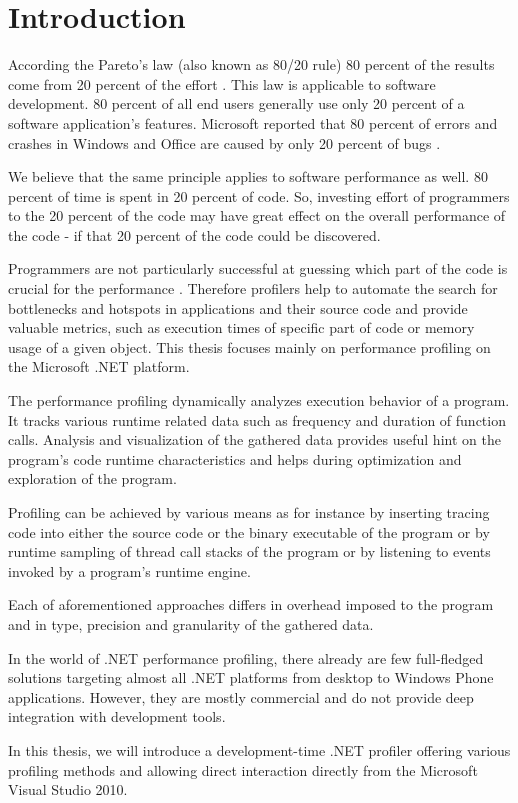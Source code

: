 \chapter{Introduction}

According the Pareto's law (also known as 80/20 rule) 80 percent of the results come from 20 percent of the effort \cite{RicKoch1999}. This law is applicable to software development. 80 percent of all end users generally use only 20 percent of a software application's features. Microsoft reported that 80 percent of errors and crashes in Windows and Office are caused by only 20 percent of bugs \cite{PauRoon2002}.

We believe that the same principle applies to software performance as well. 80 percent of time is spent in 20 percent of code.  So, investing effort of programmers to the 20 percent of the code may have great effect on the overall performance of the code - if that 20 percent of the code could be discovered.

Programmers are not particularly successful at guessing which part of the code is crucial for the performance \cite{SteMcCo2004}. Therefore profilers help to automate the search for bottlenecks and hotspots in applications and their source code and provide valuable metrics, such as execution times of specific part of code or memory usage of a given object. This thesis focuses mainly on performance profiling on the Microsoft .NET platform.

The performance profiling dynamically analyzes execution behavior of a program. It tracks various runtime related data such as frequency and duration of function calls. Analysis and visualization of the gathered data provides useful hint on the program's code runtime characteristics and helps during optimization and exploration of the program.
	
Profiling can be achieved by various means as for instance by inserting tracing code into either the source code or the binary executable of the program or by runtime sampling of thread call stacks of the program or by listening to events invoked by a program's runtime engine.

Each of aforementioned approaches differs in overhead imposed to the program and in type, precision and granularity of the gathered data.

In the world of .NET performance profiling, there already are few full-fledged solutions targeting almost all .NET platforms from desktop to Windows Phone applications. However, they are mostly commercial and do not provide deep integration with development tools.  

In this thesis, we will introduce a development-time .NET profiler offering various profiling methods and allowing direct interaction directly from the Microsoft Visual Studio 2010.